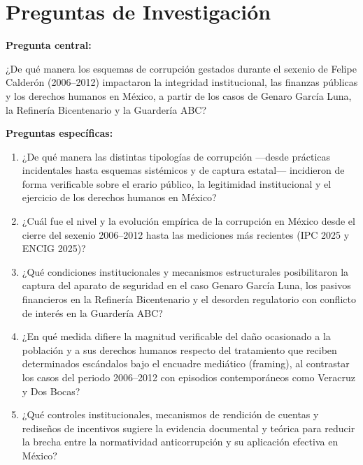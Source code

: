 \documentclass[12pt,letterpaper,oneside]{article}
\begin{document}
\clearpage


\section{Preguntas de Investigación}

\textbf{Pregunta central:}

¿De qué manera los esquemas de corrupción gestados durante el sexenio de Felipe Calderón (2006--2012) impactaron la integridad institucional, las finanzas públicas y los derechos humanos en México, a partir de los casos de Genaro García Luna, la Refinería Bicentenario y la Guardería ABC?

\textbf{Preguntas específicas:}

\begin{enumerate}
  \item ¿De qué manera las distintas tipologías de corrupción ---desde prácticas incidentales hasta esquemas sistémicos y de captura estatal--- incidieron de forma verificable sobre el erario público, la legitimidad institucional y el ejercicio de los derechos humanos en México?
  
  \item ¿Cuál fue el nivel y la evolución empírica de la corrupción en México desde el cierre del sexenio 2006--2012 hasta las mediciones más recientes (IPC 2025 y ENCIG 2025)?
  
  \item ¿Qué condiciones institucionales y mecanismos estructurales posibilitaron la captura del aparato de seguridad en el caso Genaro García Luna, los pasivos financieros en la Refinería Bicentenario y el desorden regulatorio con conflicto de interés en la Guardería ABC?
  
  \item ¿En qué medida difiere la magnitud verificable del daño ocasionado a la población y a sus derechos humanos respecto del tratamiento que reciben determinados escándalos bajo el encuadre mediático (framing), al contrastar los casos del periodo 2006--2012 con episodios contemporáneos como Veracruz y Dos Bocas?
  
  \item ¿Qué controles institucionales, mecanismos de rendición de cuentas y rediseños de incentivos sugiere la evidencia documental y teórica para reducir la brecha entre la normatividad anticorrupción y su aplicación efectiva en México?
\end{enumerate}
\end{document}
